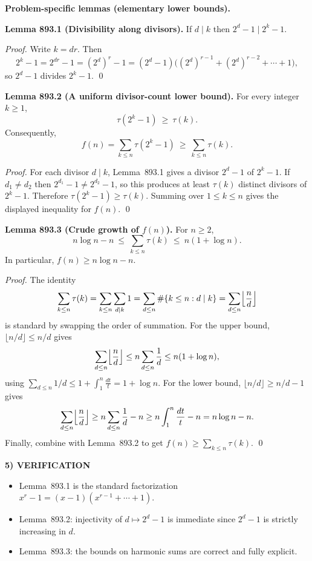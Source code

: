 \medskip
\textbf{Problem-specific lemmas (elementary lower bounds).}

\medskip
\noindent\textbf{Lemma 893.1 (Divisibility along divisors).}
If $d\mid k$ then $2^d-1\mid 2^k-1$.

\emph{Proof.}
Write $k=dr$. Then
\[
2^k-1 = 2^{dr}-1 = (2^d)^r-1 = (2^d-1)\bigl((2^d)^{r-1}+(2^d)^{r-2}+\cdots+1\bigr),
\]
so $2^d-1$ divides $2^k-1$.
\qed

\medskip
\noindent\textbf{Lemma 893.2 (A uniform divisor-count lower bound).}
For every integer $k\ge 1$,
\[ \tau(2^k-1)\ \ge\ \tau(k). \]
Consequently,
\[ f(n)=\sum_{k\le n}\tau(2^k-1)\ \ge\ \sum_{k\le n}\tau(k). \]

\emph{Proof.}
For each divisor $d\mid k$, Lemma~893.1 gives a divisor $2^d-1$ of $2^k-1$.
If $d_1\ne d_2$ then $2^{d_1}-1\ne 2^{d_2}-1$, so this produces at least $\tau(k)$
distinct divisors of $2^k-1$. Therefore $\tau(2^k-1)\ge \tau(k)$.
Summing over $1\le k\le n$ gives the displayed inequality for $f(n)$.
\qed

\medskip
\noindent\textbf{Lemma 893.3 (Crude growth of $f(n)$).}
For $n\ge 2$,
\[ n\log n - n\ \le\ \sum_{k\le n}\tau(k)\ \le\ n(1+\log n). \]
In particular, $f(n)\ge n\log n - n$.

\emph{Proof.}
The identity
\[ \sum_{k\le n}\tau(k) = \sum_{k\le n}\sum_{d\mid k} 1 = \sum_{d\le n}\#\{k\le n: d\mid k\}
= \sum_{d\le n} \Bigl\lfloor\frac{n}{d}\Bigr\rfloor
\]
is standard by swapping the order of summation.
For the upper bound, $\lfloor n/d\rfloor\le n/d$ gives
\[ \sum_{d\le n}\Bigl\lfloor\frac{n}{d}\Bigr\rfloor \le n\sum_{d\le n}\frac{1}{d}
\le n(1+\log n), \]
using $\sum_{d\le n}1/d \le 1+\int_1^n \frac{dt}{t}=1+\log n$.
For the lower bound, $\lfloor n/d\rfloor\ge n/d -1$ gives
\[ \sum_{d\le n}\Bigl\lfloor\frac{n}{d}\Bigr\rfloor \ge n\sum_{d\le n}\frac{1}{d}-n
\ge n\int_1^n \frac{dt}{t} - n = n\log n - n.
\]
Finally, combine with Lemma~893.2 to get $f(n)\ge \sum_{k\le n}\tau(k)$.
\qed

\medskip
\noindent\textbf{5) VERIFICATION}

\begin{itemize}
\item Lemma~893.1 is the standard factorization $x^r-1=(x-1)(x^{r-1}+\cdots+1)$.
\item Lemma~893.2: injectivity of $d\mapsto 2^d-1$ is immediate since $2^d-1$ is
strictly increasing in $d$.
\item Lemma~893.3: the bounds on harmonic sums are correct and fully explicit.
\end{itemize}

